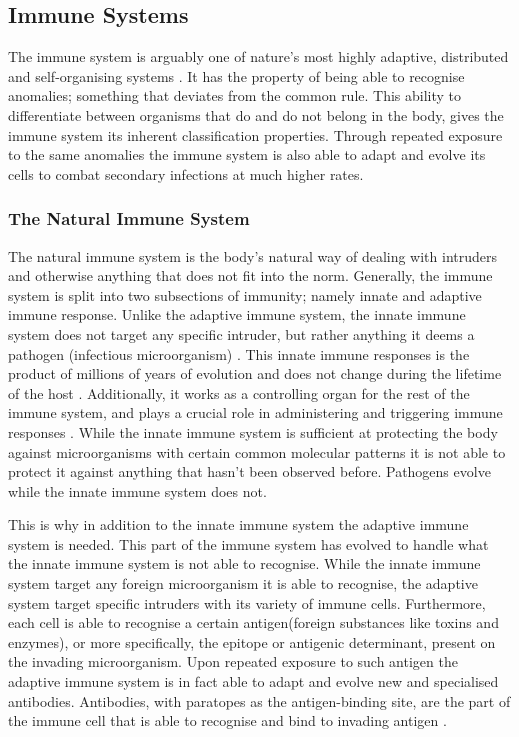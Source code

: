 \subsection{Immune Systems}
\label{sec:background_ais}
The immune system is arguably one of nature's most highly adaptive, distributed and self-organising systems \cite{AIS:Timmis2004}. It has the property of being able to recognise anomalies; something that deviates from the common rule. This ability to differentiate between organisms that do and do not belong in the body, gives the immune system its inherent classification properties. Through repeated exposure to the same anomalies the immune system is also able to adapt and evolve its cells to combat secondary infections at much higher rates.

\subsubsection{The Natural Immune System}
The natural immune system is the body's natural way of dealing with intruders and otherwise anything that does not fit into the norm. Generally, the immune system is split into two subsections of immunity; namely innate and adaptive immune response. Unlike the adaptive immune system, the innate immune system does not target any specific intruder, but rather anything it deems a pathogen (infectious microorganism) \cite{AIS:Timmis2004}. This innate immune responses is the product of millions of years of evolution and does not change during the lifetime of the host \cite{AIS:janeway2001immunobiology}. Additionally, it works as a controlling organ for the rest of the immune system, and plays a crucial role in administering and triggering immune responses \cite{AIS:Timmis2004}. While the innate immune system is sufficient at protecting the body against microorganisms with certain common molecular patterns it is not able to protect it against anything that hasn't been observed before. Pathogens evolve while the innate immune system does not. 

This is why in addition to the innate immune system the adaptive immune system is needed. This part of the immune system has evolved to handle what the innate immune system is not able to recognise. While the innate immune system target any foreign microorganism it is able to recognise, the adaptive system target specific intruders with its variety of immune cells. Furthermore, each cell is able to recognise a certain antigen(foreign substances like toxins and enzymes), or more specifically, the epitope or antigenic determinant, present on the invading microorganism. Upon repeated exposure to such antigen the adaptive immune system is in fact able to adapt and evolve new and specialised antibodies. Antibodies, with paratopes as the antigen-binding site, are the part of the immune cell that is able to recognise and bind to invading antigen \cite{AIS:roitt1994essential}.

